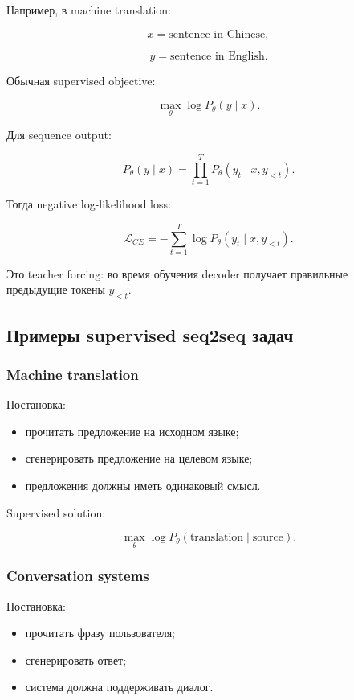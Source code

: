 \documentclass[a4paper,12pt]{article}
\begin{document}
Например, в machine translation:

\[
x = \text{sentence in Chinese},
\]

\[
y = \text{sentence in English}.
\]

Обычная supervised objective:

\[
\max_\theta \log P_\theta(y \mid x).
\]

Для sequence output:

\[
P_\theta(y \mid x)
=
\prod_{t=1}^{T}
P_\theta(y_t \mid x, y_{<t}).
\]

Тогда negative log-likelihood loss:

\[
\mathcal{L}_{CE}
=
-
\sum_{t=1}^{T}
\log P_\theta(y_t \mid x, y_{<t}).
\]

Это teacher forcing: во время обучения decoder получает правильные предыдущие токены \(y_{<t}\).

\subsection{Примеры supervised seq2seq задач}

\subsubsection{Machine translation}

Постановка:

\begin{itemize}
    \item прочитать предложение на исходном языке;
    \item сгенерировать предложение на целевом языке;
    \item предложения должны иметь одинаковый смысл.
\end{itemize}

Supervised solution:

\[
\max_\theta \log P_\theta(\text{translation}\mid \text{source}).
\]

\subsubsection{Conversation systems}

Постановка:

\begin{itemize}
    \item прочитать фразу пользователя;
    \item сгенерировать ответ;
    \item система должна поддерживать диалог.
\end{itemize}
\end{document}
